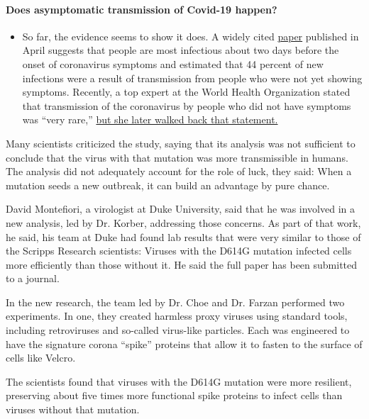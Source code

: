 \begin{itemize}
{  \paragraph{Does asymptomatic transmission of Covid-19
  happen?}\label{does-asymptomatic-transmission-of-covid-19-happen}}

  \begin{itemize}
  \tightlist
  \item
    So far, the evidence seems to show it does. A widely cited
    \href{https://www.nature.com/articles/s41591-020-0869-5}{paper}
    published in April suggests that people are most infectious about
    two days before the onset of coronavirus symptoms and estimated that
    44 percent of new infections were a result of transmission from
    people who were not yet showing symptoms. Recently, a top expert at
    the World Health Organization stated that transmission of the
    coronavirus by people who did not have symptoms was ``very rare,''
    \href{https://www.nytimes.com/2020/06/09/world/coronavirus-updates.html?action=click\&pgtype=Article\&state=default\&region=MAIN_CONTENT_3\&context=storylines_faq\#link-1f302e21}{but
    she later walked back that statement.}
  \end{itemize}
\end{itemize}

Many scientists criticized the study, saying that its analysis was not
sufficient to conclude that the virus with that mutation was more
transmissible in humans. The analysis did not adequately account for the
role of luck, they said: When a mutation seeds a new outbreak, it can
build an advantage by pure chance.

David Montefiori, a virologist at Duke University, said that he was
involved in a new analysis, led by Dr. Korber, addressing those
concerns. As part of that work, he said, his team at Duke had found lab
results that were very similar to those of the Scripps Research
scientists: Viruses with the D614G mutation infected cells more
efficiently than those without it. He said the full paper has been
submitted to a journal.

In the new research, the team led by Dr. Choe and Dr. Farzan performed
two experiments. In one, they created harmless proxy viruses using
standard tools, including retroviruses and so-called virus-like
particles. Each was engineered to have the signature corona ``spike''
proteins that allow it to fasten to the surface of cells like Velcro.

The scientists found that viruses with the D614G mutation were more
resilient, preserving about five times more functional spike proteins to
infect cells than viruses without that mutation.

